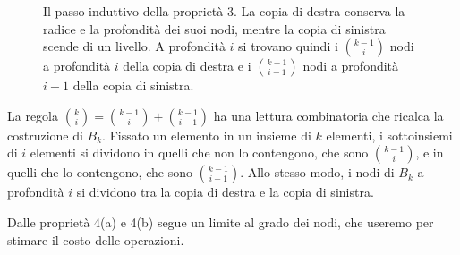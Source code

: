 \begin{figure}[htbp]
\centering
{}
\caption{Il passo induttivo della proprietà 3. La copia di destra conserva la radice e la profondità dei suoi nodi, mentre la copia di sinistra scende di un livello. A profondità $i$ si trovano quindi i $\binom{k-1}{i}$ nodi a profondità $i$ della copia di destra e i $\binom{k-1}{i-1}$ nodi a profondità $i-1$ della copia di sinistra.}
\label{fig:hb-dimostrazione}
\end{figure}

\begin{osservazione}
La regola $\binom{k}{i} = \binom{k-1}{i} + \binom{k-1}{i-1}$ ha una lettura combinatoria che ricalca la costruzione di $B_k$. Fissato un elemento in un insieme di $k$ elementi, i sottoinsiemi di $i$ elementi si dividono in quelli che non lo contengono, che sono $\binom{k-1}{i}$, e in quelli che lo contengono, che sono $\binom{k-1}{i-1}$. Allo stesso modo, i nodi di $B_k$ a profondità $i$ si dividono tra la copia di destra e la copia di sinistra.
\end{osservazione}

Dalle proprietà 4(a) e 4(b) segue un limite al grado dei nodi, che useremo per stimare il costo delle operazioni.

